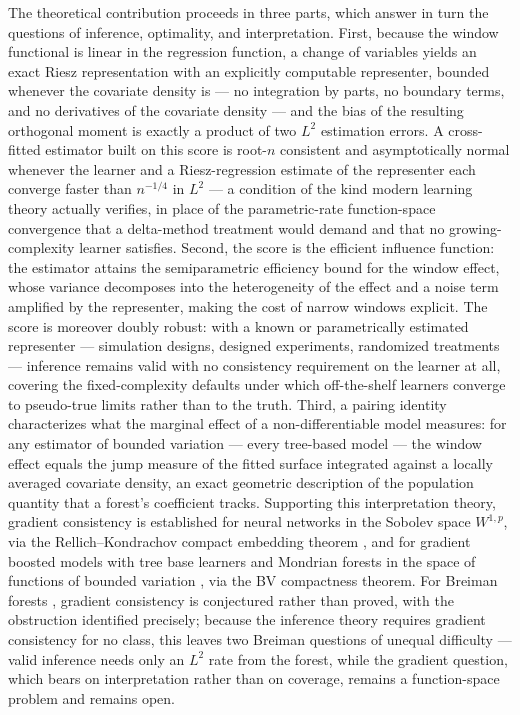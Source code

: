 \documentclass[12pt]{article}
\begin{document}
	The theoretical contribution proceeds in three parts, which answer in turn the
	questions of inference, optimality, and interpretation. First, because the window
	functional is linear in the regression function, a change of variables yields an exact Riesz representation with an explicitly computable representer, bounded whenever the covariate density is ---
	no integration by parts, no boundary terms, and no derivatives of the covariate
	density --- and the bias of the resulting orthogonal moment is exactly a product
	of two $L^2$ estimation errors. A cross-fitted estimator built on this score is
	root-$n$ consistent and asymptotically normal whenever the learner and a
	Riesz-regression estimate of the representer each converge faster than
	$n^{-1/4}$ in $L^2$ --- a condition of the kind modern learning theory actually
	verifies, in place of the parametric-rate function-space convergence that a
	delta-method treatment would demand and that no growing-complexity learner
	satisfies. Second, the score is the efficient influence function: the estimator
	attains the semiparametric efficiency bound for the window effect, whose variance
	decomposes into the heterogeneity of the effect and a noise term amplified by the
	representer, making the cost of narrow windows explicit. The score is moreover
	doubly robust: with a known or parametrically estimated representer --- simulation
	designs, designed experiments, randomized treatments --- inference remains valid
	with no consistency requirement on the learner at all, covering the
	fixed-complexity defaults under which off-the-shelf learners converge to
	pseudo-true limits rather than to the truth. Third, a pairing
	identity characterizes what the marginal effect of a non-differentiable model
	measures: for any estimator of bounded variation --- every tree-based model ---
	the window effect equals the jump measure of the fitted surface integrated
	against a locally averaged covariate density, an exact geometric description of
	the population quantity that a forest's coefficient tracks. Supporting this
	interpretation theory, gradient consistency is established for neural networks
	\citep{hornik1990universal} in the Sobolev space $W^{1,p}$, via the
	Rellich--Kondrachov compact embedding theorem \citep{evans2010pde}, and for
	gradient boosted models with tree base learners and Mondrian forests
	\citep{lakshminarayanan2014mondrian, mourtada2017mondrian} in the space of
	functions of bounded variation \citep{ambrosio2000bv}, via the BV compactness
	theorem. For Breiman forests \citep{breiman2001rf, scornet2015forests},
	gradient consistency is conjectured rather than proved, with the obstruction
	identified precisely; because the inference theory requires gradient
	consistency for no class, this leaves two Breiman questions of unequal
	difficulty --- valid inference needs only an $L^2$ rate from the forest, while
	the gradient question, which bears on interpretation rather than on coverage,
	remains a function-space problem and remains open.
	
\end{document}
